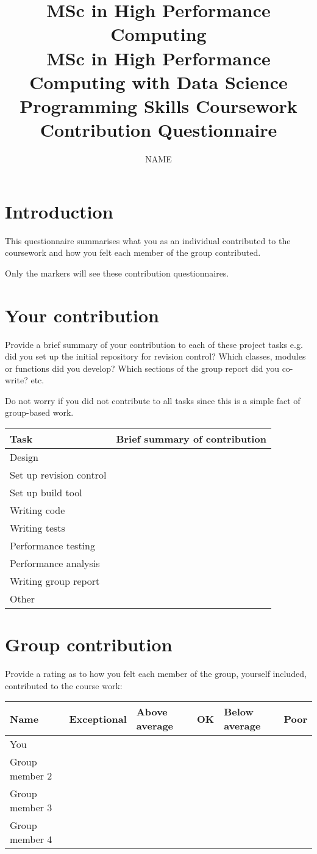 \documentclass{article}
\title{MSc in High Performance Computing \\
MSc in High Performance Computing with Data Science \\
Programming Skills Coursework \\
Contribution Questionnaire}
\author{NAME}
\begin{document}
\makeEPCCtitle

\section{Introduction}

This questionnaire summarises what you as an individual contributed to
the coursework and how you felt each member of the group
contributed. 

Only the markers will see these contribution questionnaires. 

\section{Your contribution}

Provide a brief summary of your contribution to each of these project
tasks e.g. did you set up the initial repository for revision control?
Which classes, modules or functions did you develop? Which sections of
the group report did you co-write? etc. 

Do not worry if you did not contribute to all tasks since this is a
simple fact of group-based work.

\begin{tabular}{|l|l|}
\hline
Task & Brief summary of contribution \\ 
\hline
\hline
Design & \\
\hline
Set up revision control & \\
\hline
Set up build tool & \\
\hline
Writing code & \\
\hline
Writing tests & \\
\hline
Performance testing & \\
\hline
Performance analysis & \\
\hline
Writing group report & \\
\hline
Other & \\
\hline
\end{tabular}

\section{Group contribution}

Provide a rating as to how you felt each member of the group, yourself
included, contributed to the course work:

\begin{tabular}{|l|l|l|l|l|l|}
\hline
Name & Exceptional & Above average & OK & Below average & Poor \\
\hline
\hline
You & & & & & \\
\hline
Group member 2 & & & & & \\
\hline
Group member 3 & & & & & \\
\hline
Group member 4 & & & & & \\
\hline
\end{tabular}
\end{document}
